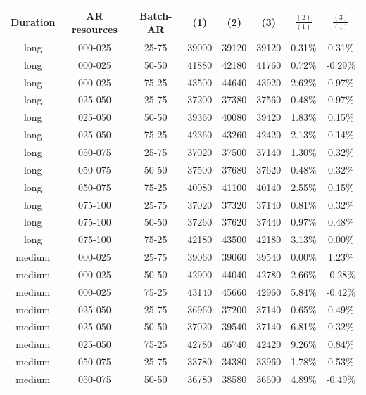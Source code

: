 \begin{table}
\begin{center}
\begin{tabular}{|c|c|c|c|c|c|c|c|}
\hline
\textbf{Duration} & \textbf{AR resources} & \textbf{Batch-AR} & \textbf{(1)} & \textbf{(2)} & \textbf{(3)} &  \textbf{$\frac{(2)}{(1)}$} & \textbf{$\frac{(3)}{(1)}$}
\\\hline
long & 000-025 & 25-75 & 39000 & 39120 & 39120 & 0.31\% & 0.31\%
\\\hline
long & 000-025 & 50-50 & 41880 & 42180 & 41760 & 0.72\% & -0.29\%
\\\hline
long & 000-025 & 75-25 & 43500 & 44640 & 43920 & 2.62\% & 0.97\%
\\\hline
long & 025-050 & 25-75 & 37200 & 37380 & 37560 & 0.48\% & 0.97\%
\\\hline
long & 025-050 & 50-50 & 39360 & 40080 & 39420 & 1.83\% & 0.15\%
\\\hline
long & 025-050 & 75-25 & 42360 & 43260 & 42420 & 2.13\% & 0.14\%
\\\hline
long & 050-075 & 25-75 & 37020 & 37500 & 37140 & 1.30\% & 0.32\%
\\\hline
long & 050-075 & 50-50 & 37500 & 37680 & 37620 & 0.48\% & 0.32\%
\\\hline
long & 050-075 & 75-25 & 40080 & 41100 & 40140 & 2.55\% & 0.15\%
\\\hline
long & 075-100 & 25-75 & 37020 & 37320 & 37140 & 0.81\% & 0.32\%
\\\hline
long & 075-100 & 50-50 & 37260 & 37620 & 37440 & 0.97\% & 0.48\%
\\\hline
long & 075-100 & 75-25 & 42180 & 43500 & 42180 & 3.13\% & 0.00\%
\\\hline
medium & 000-025 & 25-75 & 39060 & 39060 & 39540 & 0.00\% & 1.23\%
\\\hline
medium & 000-025 & 50-50 & 42900 & 44040 & 42780 & 2.66\% & -0.28\%
\\\hline
medium & 000-025 & 75-25 & 43140 & 45660 & 42960 & 5.84\% & -0.42\%
\\\hline
medium & 025-050 & 25-75 & 36960 & 37200 & 37140 & 0.65\% & 0.49\%
\\\hline
medium & 025-050 & 50-50 & 37020 & 39540 & 37140 & 6.81\% & 0.32\%
\\\hline
medium & 025-050 & 75-25 & 42780 & 46740 & 42420 & 9.26\% & 0.84\%
\\\hline
medium & 050-075 & 25-75 & 33780 & 34380 & 33960 & 1.78\% & 0.53\%
\\\hline
medium & 050-075 & 50-50 & 36780 & 38580 & 36600 & 4.89\% & -0.49\%

\end{tabular}
\end{center}
\end{table}
